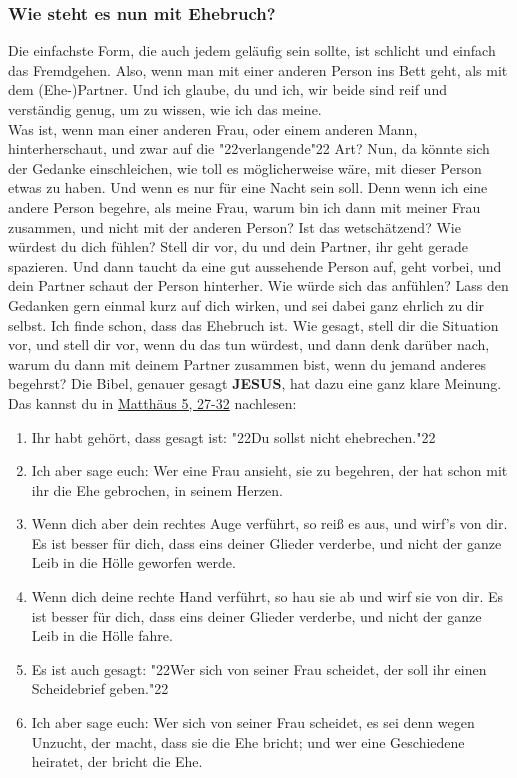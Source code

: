 \documentclass[10pt,a5paper]{article}
\newcommand{\Jesus}[0]{\textbf{JESUS}}
\newcommand{\q}[1]{\char"22{#1}\char"22 }
\begin{document}
	\subsubsection{Wie steht es nun mit Ehebruch?}
		Die einfachste Form,
		die auch jedem gel\"aufig sein sollte,
		ist schlicht und einfach das Fremdgehen.
		Also,
		wenn man mit einer anderen Person ins Bett geht,
		als mit dem (Ehe-)Partner.
		Und ich glaube,
		du und ich,
		wir beide sind reif und verst\"andig genug,
		um zu wissen,
		wie ich das meine.
		\\
		Was ist,
		wenn man einer anderen Frau,
		oder einem anderen Mann,
		hinterherschaut,
		und zwar auf die \q{verlangende} Art?
		Nun,
		da k\"onnte sich der Gedanke einschleichen,
		wie toll es m\"oglicherweise w\"are,
		mit dieser Person etwas zu haben.
		Und wenn es nur f\"ur eine Nacht sein soll.
		Denn wenn ich eine andere Person begehre,
		als meine Frau,
		warum bin ich dann mit meiner Frau zusammen,
		und nicht mit der anderen Person?
		Ist das wetsch\"atzend?
		Wie w\"urdest du dich f\"uhlen?
		Stell dir vor,
		du und dein Partner,
		ihr geht gerade spazieren.
		Und dann taucht da eine gut aussehende Person auf,
		geht vorbei,
		und dein Partner schaut der Person hinterher.
		Wie w\"urde sich das anf\"uhlen?
		Lass den Gedanken gern einmal kurz auf dich wirken,
		und sei dabei ganz ehrlich zu dir selbst.
		Ich finde schon,
		dass das Ehebruch ist.
		Wie gesagt,
		stell dir die Situation vor,
		und stell dir vor,
		wenn du das tun w\"urdest,
		und dann denk dar\"uber nach,
		warum du dann mit deinem Partner zusammen bist,
		wenn du jemand anderes begehrst?
		Die Bibel,
		genauer gesagt {\Jesus},
		hat dazu eine ganz klare Meinung.
		Das kannst du in \href{https://www.die-bibel.de/bibeln/online-bibeln/lesen/LU17/MAT.5/Matthäus-5}{Matth\"aus 5, 27-32} nachlesen:
		\begin{enumerate}[noitemsep,start=27]
			\item	Ihr habt geh\"ort,
					dass gesagt ist:
					\q{Du sollst nicht ehebrechen.}
			\item	Ich aber sage euch:
					Wer eine Frau ansieht,
					sie zu begehren,
					der hat schon mit ihr die Ehe gebrochen,
					in seinem Herzen.
			\item	Wenn dich aber dein rechtes Auge verf\"uhrt,
					so rei{\ss} es aus,
					und wirf's von dir.
					Es ist besser f\"ur dich,
					dass eins deiner Glieder verderbe,
					und nicht der ganze Leib in die H\"olle geworfen werde.
			\item	Wenn dich deine rechte Hand verf\"uhrt,
					so hau sie ab und wirf sie von dir.
					Es ist besser für dich,
					dass eins deiner Glieder verderbe,
					und nicht der ganze Leib in die H\"olle fahre.
			\item	Es ist auch gesagt:
					\q{Wer sich von seiner Frau scheidet,
					der soll ihr einen Scheidebrief geben.}
			\item	Ich aber sage euch:
					Wer sich von seiner Frau scheidet,
					es sei denn wegen Unzucht,
					der macht,
					dass sie die Ehe bricht;
					und wer eine Geschiedene heiratet,
					der bricht die Ehe.
		\end{enumerate}
\end{document}

